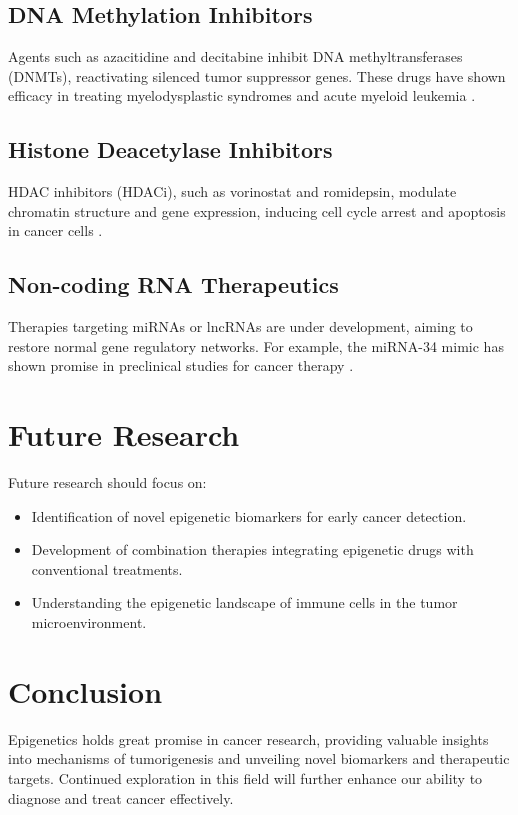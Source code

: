 \documentclass{article}
\begin{document}
\subsection{DNA Methylation Inhibitors}
Agents such as azacitidine and decitabine inhibit DNA methyltransferases (DNMTs), reactivating silenced tumor suppressor genes. These drugs have shown efficacy in treating myelodysplastic syndromes and acute myeloid leukemia \cite{Gore2006}.

\subsection{Histone Deacetylase Inhibitors}
HDAC inhibitors (HDACi), such as vorinostat and romidepsin, modulate chromatin structure and gene expression, inducing cell cycle arrest and apoptosis in cancer cells \cite{Prince2009}.

\subsection{Non-coding RNA Therapeutics}
Therapies targeting miRNAs or lncRNAs are under development, aiming to restore normal gene regulatory networks. For example, the miRNA-34 mimic has shown promise in preclinical studies for cancer therapy \cite{Bader2010}.

\section{Future Research}
Future research should focus on:
\begin{itemize}
    \item Identification of novel epigenetic biomarkers for early cancer detection.
    \item Development of combination therapies integrating epigenetic drugs with conventional treatments.
    \item Understanding the epigenetic landscape of immune cells in the tumor microenvironment.
\end{itemize}

\section{Conclusion}
Epigenetics holds great promise in cancer research, providing valuable insights into mechanisms of tumorigenesis and unveiling novel biomarkers and therapeutic targets. Continued exploration in this field will further enhance our ability to diagnose and treat cancer effectively.



\end{document}
